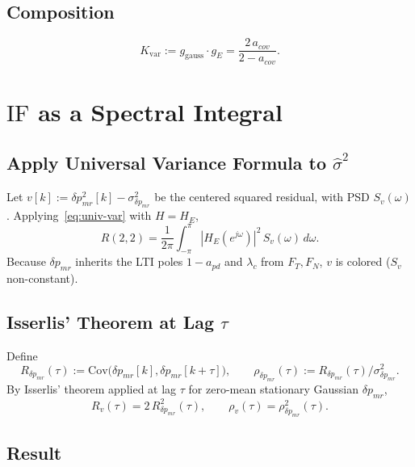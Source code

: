\documentclass[11pt,a4paper]{ctexart}
\newcommand{\lc}{\lambda_c}
\newcommand{\dpmr}{\delta p_{mr}}
\newcommand{\FT}{F_{T}}
\newcommand{\FN}{F_{N}}
\newcommand{\HE}{H_{E}}
\newcommand{\apd}{a_{pd}}
\newcommand{\acov}{a_{cov}}
\newcommand{\sighatsq}{\hat{\sigma}^{2}}
\newcommand{\Kvar}{K_{\mathrm{var}}}
\newcommand{\ggauss}{g_{\mathrm{gauss}}}
\newcommand{\gE}{g_{E}}
\newcommand{\IF}{\mathrm{IF}}
\newcommand{\Rdpmr}{R_{\dpmr}}
\newcommand{\rhodpmr}{\rho_{\dpmr}}
\begin{document}
\subsection{Composition}
\begin{equation}
\Kvar := \ggauss\cdot\gE = \frac{2\,\acov}{2-\acov}.
\label{eq:Kvar}
\end{equation}

\section{$\IF$ as a Spectral Integral}
\label{sec:IF-int}

\subsection{Apply Universal Variance Formula to $\sighatsq$}

Let $v[k] := \dpmr^{2}[k] - \sigma^{2}_{\dpmr}$ be the centered squared residual, with PSD $S_{v}(\omega)$. Applying~\eqref{eq:univ-var} with $H=\HE$,
\begin{equation}
R(2,2) = \frac{1}{2\pi}\!\!\int_{-\pi}^{\pi}\!\!|\HE(e^{j\omega})|^{2}\,S_{v}(\omega)\,d\omega.
\label{eq:R22-integral}
\end{equation}
Because $\dpmr$ inherits the LTI poles $1-\apd$ and $\lc$ from $\FT,\FN$, $v$ is colored ($S_{v}$ non-constant).

\subsection{Isserlis' Theorem at Lag $\tau$}

Define
\begin{equation}
\Rdpmr(\tau) := \mathrm{Cov}\bigl(\dpmr[k],\dpmr[k+\tau]\bigr),
\qquad
\rhodpmr(\tau) := \Rdpmr(\tau)/\sigma^{2}_{\dpmr}.
\label{eq:Rdpmr-def}
\end{equation}
By Isserlis' theorem applied at lag $\tau$ for zero-mean stationary Gaussian $\dpmr$,
\begin{equation}
R_{v}(\tau) = 2\,\Rdpmr^{2}(\tau),\qquad
\rho_{v}(\tau) = \rhodpmr^{2}(\tau).
\label{eq:isserlis}
\end{equation}

\subsection{Result}
\end{document}
